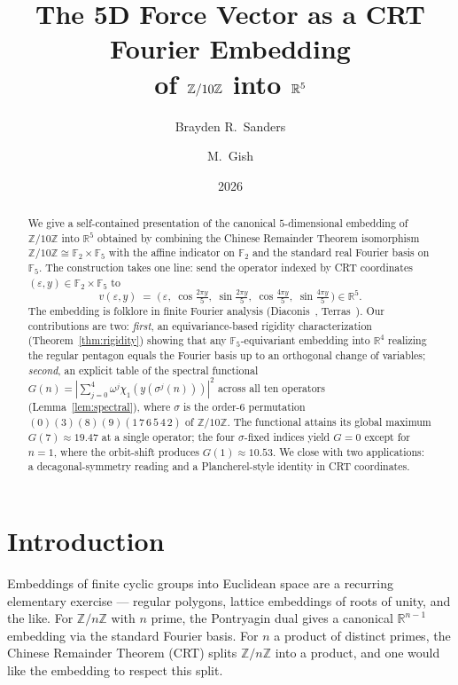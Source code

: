 \documentclass[11pt,reqno]{amsart}
\title[5D Fourier Embedding of \texorpdfstring{$\Z/10\Z$}{Z/10Z}]
  {The 5D Force Vector as a CRT Fourier Embedding\\
   of $\Z/10\Z$ into $\R^5$}
\author{Brayden R.\ Sanders}
\author{M.\ Gish}
\date{2026}
\theoremstyle{definition}
\newcommand{\Z}{\mathbb{Z}}
\newcommand{\R}{\mathbb{R}}
\newcommand{\F}{\mathbb{F}}
\begin{document}
\begin{abstract}
We give a self-contained presentation of the canonical $5$-dimensional
embedding of $\Z/10\Z$ into $\R^5$ obtained by combining the Chinese
Remainder Theorem isomorphism $\Z/10\Z \cong \F_2 \times \F_5$ with
the affine indicator on $\F_2$ and the standard real Fourier basis on
$\F_5$. The construction takes one line: send the operator indexed
by CRT coordinates $(\varepsilon, y) \in \F_2 \times \F_5$ to
\[ v(\varepsilon, y) \;=\;
   \bigl(\,\varepsilon,\;
   \cos\tfrac{2\pi y}{5},\;\sin\tfrac{2\pi y}{5},\;
   \cos\tfrac{4\pi y}{5},\;\sin\tfrac{4\pi y}{5}\,\bigr) \in \R^5. \]
The embedding is folklore in finite Fourier analysis
(Diaconis~\cite{Diaconis1988}, Terras~\cite{Terras1999}). Our
contributions are two: \emph{first}, an equivariance-based rigidity
characterization (Theorem~\ref{thm:rigidity}) showing that any
$\F_5$-equivariant embedding into $\R^4$ realizing the regular
pentagon equals the Fourier basis up to an orthogonal change of
variables; \emph{second}, an explicit table of the spectral
functional
$G(n) = |\sum_{j=0}^{4} \omega^{j} \chi_{1}(y(\sigma^{j}(n)))|^{2}$
across all ten operators (Lemma~\ref{lem:spectral}), where $\sigma$
is the order-$6$ permutation
$(0)(3)(8)(9)(1\,7\,6\,5\,4\,2)$ of $\Z/10\Z$. The functional
attains its global maximum $G(7) \approx 19.47$ at a single
operator; the four $\sigma$-fixed indices yield $G = 0$ except for
$n = 1$, where the orbit-shift produces $G(1) \approx 10.53$.
We close with two applications: a decagonal-symmetry reading and a
Plancherel-style identity in CRT coordinates.
\end{abstract}

\maketitle

\section{Introduction}
\label{sec:intro}

Embeddings of finite cyclic groups into Euclidean space are a
recurring elementary exercise --- regular polygons, lattice
embeddings of roots of unity, and the like. For $\Z/n\Z$ with
$n$ prime, the Pontryagin dual gives a canonical $\R^{n-1}$
embedding via the standard Fourier basis. For $n$ a product of
distinct primes, the Chinese Remainder Theorem (CRT) splits
$\Z/n\Z$ into a product, and one would like the embedding to
respect this split.
\end{document}
